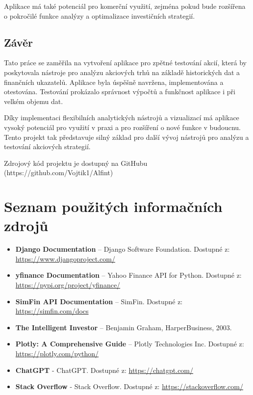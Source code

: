 \documentclass[12pt, a4paper]{report}
\begin{document}
Aplikace má také potenciál pro komerční využití, zejména pokud bude rozšířena o pokročilé funkce analýzy a optimalizace investičních strategií.

\section{Závěr}

Tato práce se zaměřila na vytvoření aplikace pro zpětné testování akcií, která by poskytovala nástroje pro analýzu akciových trhů na základě historických dat a finančních ukazatelů. Aplikace byla úspěšně navržena, implementována a otestována. Testování prokázalo správnost výpočtů a funkčnost aplikace i při velkém objemu dat.

Díky implementaci flexibilních analytických nástrojů a vizualizací má aplikace vysoký potenciál pro využití v praxi a pro rozšíření o nové funkce v budoucnu. Tento projekt tak představuje silný základ pro další vývoj nástrojů pro analýzu a testování akciových strategií.

 Zdrojový kód projektu je dostupný na GitHubu (https://github.com/Vojtik1/Alfint)

\chapter*{Seznam použitých informačních zdrojů}

\begin{itemize}
    \item \textbf{Django Documentation} – Django Software Foundation. Dostupné z: \url{https://www.djangoproject.com/}
    \item \textbf{yfinance Documentation} – Yahoo Finance API for Python. Dostupné z: \url{https://pypi.org/project/yfinance/}
    \item \textbf{SimFin API Documentation} – SimFin. Dostupné z: \url{https://simfin.com/docs}
    \item \textbf{The Intelligent Investor} – Benjamin Graham, HarperBusiness, 2003.
    \item \textbf{Plotly: A Comprehensive Guide} – Plotly Technologies Inc. Dostupné z: \url{https://plotly.com/python/}
    \item \textbf{ChatGPT} - ChatGPT. Dostupné z: \url{https://chatgpt.com/}
    \item \textbf{Stack Overflow} - Stack Overflow. Dostupné z: \url{https://stackoverflow.com/}
\end{itemize}
\end{document}
